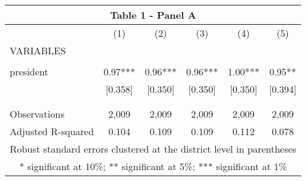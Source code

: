 \begin{tabular}{lccccc}
\multicolumn{6}{c}{Table 1 - Panel A} \\ \hline
 & (1) & (2) & (3) & (4) & (5) \\
VARIABLES &  &  &  &  &  \\ \hline
 &  &  &  &  &  \\
president & 0.97*** & 0.96*** & 0.96*** & 1.00*** & 0.95** \\
 & [0.358] & [0.350] & [0.350] & [0.350] & [0.394] \\
 &  &  &  &  &  \\
 &  &  &  &  &  \\
Observations & 2,009 & 2,009 & 2,009 & 2,009 & 2,009 \\
 Adjusted R-squared & 0.104 & 0.109 & 0.109 & 0.112 & 0.078 \\ \hline
\multicolumn{6}{c}{ Robust standard errors clustered at the district level in parentheses} \\
\multicolumn{6}{c}{ * significant at 10\%; ** significant at 5\%; *** significant at 1\%} \\
\end{tabular}
